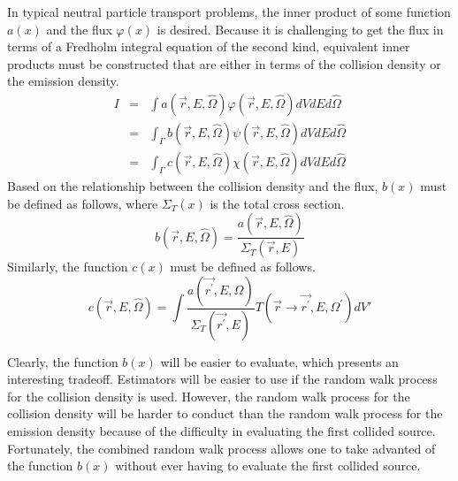 In typical neutral particle transport problems, the inner product of some 
function $a(x)$ and the flux $\varphi(x)$ is desired. Because it is challenging
to get the flux in terms of a Fredholm integral equation of the second kind,
equivalent inner products must be constructed that are either in terms of the
collision density or the emission density. 
\begin{eqnarray}
  I & = & \int a(\vec{r},E,\hat{\Omega}) \varphi(\vec{r},E,\hat{\Omega}) 
  dVdEd\hat{\Omega} \\
  & = & \int_{\Gamma} b(\vec{r},E,\hat{\Omega}) \psi(\vec{r},E,\hat{\Omega})  
  dVdEd\hat{\Omega} \\
  & = & \int_{\Gamma} c(\vec{r},E,\hat{\Omega}) \chi(\vec{r},E,\hat{\Omega}) 
  dVdEd\hat{\Omega}
\end{eqnarray}
Based on the relationship between the collision density and the flux, $b(x)$
must be defined as follows, where $\Sigma_T(x)$ is the total cross section.
\begin{equation}
  b(\vec{r},E,\hat{\Omega}) = \frac{a(\vec{r},E,\hat{\Omega})}
  {\Sigma_T(\vec{r},E)}
  \label{eq:collision_response_function}
\end{equation}
Similarly, the function $c(x)$ must be defined as follows.
\begin{equation}
  c(\vec{r},E,\hat{\Omega}) = \int \frac{a(\vec{r^{'}},E,\hat{\Omega})}
  {\Sigma_T(\vec{r^{'}},E)} T(\vec{r} \to \vec{r^{'}},E,\Omega^{'})dV'
  \label{eq:emission_response_function}
\end{equation}

Clearly, the function $b(x)$ will be easier to evaluate, which presents an 
interesting tradeoff. Estimators will be easier to use if the random walk 
process for the collision density is used. However, the random walk process
for the collision density will be harder to conduct than the random walk 
process for the emission density because of the difficulty in evaluating the 
first collided source. Fortunately, the combined random walk process allows 
one to take advanted of the function $b(x)$ without ever having to evaluate
the first collided source.
